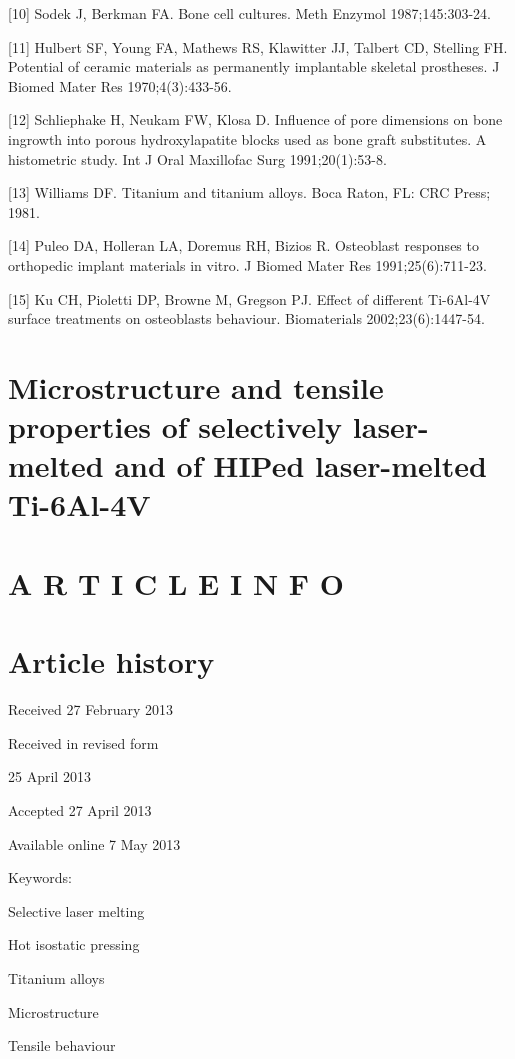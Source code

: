 \documentclass[10pt]{article}
\begin{document}
[10] Sodek J, Berkman FA. Bone cell cultures. Meth Enzymol 1987;145:303-24.

[11] Hulbert SF, Young FA, Mathews RS, Klawitter JJ, Talbert CD, Stelling FH. Potential of ceramic materials as permanently implantable skeletal prostheses. J Biomed Mater Res 1970;4(3):433-56.

[12] Schliephake H, Neukam FW, Klosa D. Influence of pore dimensions on bone ingrowth into porous hydroxylapatite blocks used as bone graft substitutes. A histometric study. Int J Oral Maxillofac Surg 1991;20(1):53-8.

[13] Williams DF. Titanium and titanium alloys. Boca Raton, FL: CRC Press; 1981.

[14] Puleo DA, Holleran LA, Doremus RH, Bizios R. Osteoblast responses to orthopedic implant materials in vitro. J Biomed Mater Res 1991;25(6):711-23.

[15] Ku CH, Pioletti DP, Browne M, Gregson PJ. Effect of different Ti-6Al-4V surface treatments on osteoblasts behaviour. Biomaterials 2002;23(6):1447-54.

\section*{Microstructure and tensile properties of selectively laser-melted and of HIPed laser-melted Ti-6Al-4V }


\section*{A R T I C L E I N F O}
\section*{Article history}
Received 27 February 2013

Received in revised form

25 April 2013

Accepted 27 April 2013

Available online 7 May 2013

Keywords:

Selective laser melting

Hot isostatic pressing

Titanium alloys

Microstructure

Tensile behaviour
\end{document}

